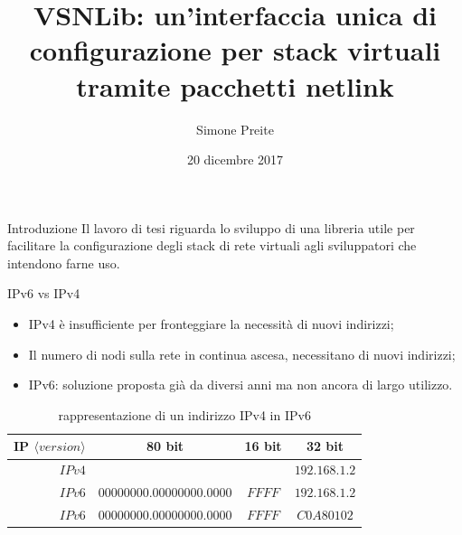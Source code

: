 \documentclass{beamer}
\author{Simone Preite}
\title{VSNLib: un'interfaccia unica di configurazione per stack virtuali tramite pacchetti netlink}
\date{20 dicembre 2017}
\begin{document}
\titlepageframe %


\begin{frame}[fragile]{Introduzione}
Il lavoro di tesi riguarda lo sviluppo di una libreria utile per facilitare la configurazione degli stack di rete virtuali  agli sviluppatori che intendono farne uso.
\end{frame}

\begin{frame}[fragile]{IPv6 vs IPv4}

\begin{itemize}
    \item IPv4 \`e insufficiente per fronteggiare la necessit\`a di nuovi indirizzi;
    \item Il numero di nodi sulla rete in continua ascesa, necessitano di nuovi indirizzi;
    \item IPv6: soluzione proposta gi\`a da diversi anni ma non ancora di largo utilizzo.
\end{itemize}
\begin{table}[h]                        %
\begin{center}                          %
\begin{tabular}{r|c|c|c}                  %
\hline
IP $\langle version \rangle$ & 80 bit & 16 bit & 32 bit\\
\hline \hline                         %
$IPv4$ &   &   & $192.168.1.2$\\           %
\hline                                  %
$IPv6$ & $00000000.00000000.0000$ & $FFFF$ & $192.168.1.2$\\           %
\hline                                  %
$IPv6$ & $00000000.00000000.0000$ & $FFFF$ & $C0A80102$\\
\hline                           %
\end{tabular}
\caption[IPv4 to IPv6 conversion]{rappresentazione di un indirizzo IPv4 in IPv6}\label{tab:IPv4toIPv6}
\end{center}
\end{table}
\end{frame}
\end{document}
